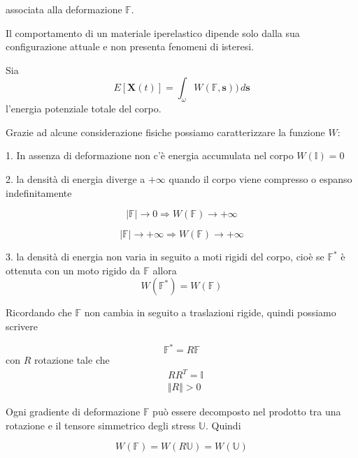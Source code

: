 associata alla deformazione $\mathbb{F}$.

Il comportamento di un materiale iperelastico dipende solo dalla sua configurazione attuale e non presenta fenomeni di isteresi.

Sia 
\begin{equation*}
E [  \mathbf{X}(t) ] = \int_{\omega} W( \mathbb{F}, \mathbf{s} )) \, d\mathbf{s}
\end{equation*}
l'energia potenziale totale del corpo.

Grazie ad alcune considerazione fisiche possiamo caratterizzare la funzione $W$:

1. In assenza di deformazione non c'è energia accumulata nel corpo $W(\mathbb{I}) = 0$

2. la densità di energia diverge a $+\infty$ quando il corpo viene compresso o espanso indefinitamente  

\begin{equation*}
\vert \mathbb{F} \vert \rightarrow 0 \Rightarrow W(\mathbb{F}) \rightarrow +\infty
\end{equation*}

\begin{equation*}
\vert \mathbb{F} \vert \rightarrow +\infty \Rightarrow W(\mathbb{F}) \rightarrow +\infty
\end{equation*}

3.  la densità di energia non varia in seguito a moti rigidi del corpo, cioè se $\mathbb{F}^*$ è ottenuta con un moto rigido da $\mathbb{F}$ allora 
\begin{equation*}
W(\mathbb{F}^*) = W(\mathbb{F})
\end{equation*}

Ricordando che $\mathbb{F}$ non cambia in seguito a traslazioni rigide, quindi possiamo scrivere

\begin{equation*}
\mathbb{F}^* = R\mathbb{F}
\end{equation*}
con $R$ rotazione tale che 
\begin{align*}
&RR^T = \mathbb{I} \\
&\Vert R \Vert > 0
\end{align*}

Ogni gradiente di deformazione $\mathbb{F}$ può essere decomposto nel prodotto tra una rotazione e il tensore simmetrico degli stress $\mathbb{U}$. Quindi

\begin{equation*}
W(\mathbb{F}) = W(R\mathbb{U}) = W(\mathbb{U})
\end{equation*}


